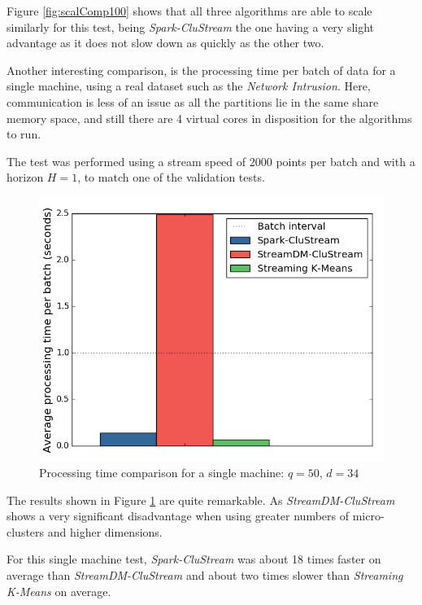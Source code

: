 \documentclass{llncs}
\begin{document}
Figure \ref{fig:scalComp100} shows that all three algorithms are able to scale similarly for this test, being \textit{Spark-CluStream} the one having a very slight advantage as it does not slow down as quickly as the other two.



Another interesting comparison, is the processing time per batch of data for a single machine, using a real dataset such as the \textit{Network Intrusion}. Here, communication is less of an issue as all the partitions lie in the same share memory space, and still there are 4 virtual cores in disposition for the algorithms to run. 

The test was performed using a stream speed of 2000 points per batch and with a horizon $H=1$, to match one of the validation tests.

\begin{figure}[h!]
 \centering
 \includegraphics[scale=0.47]{./styles/singlemachine.png}
 \caption{Processing time comparison for a single machine: $q=50$, $d=34$}
 \label{fig:singlemachine}
\end{figure}

The results shown in Figure \ref{fig:singlemachine} are quite remarkable. As \textit{StreamDM-CluStream} shows a very significant disadvantage when using greater numbers of micro-clusters and higher dimensions.

For this single machine test, \textit{Spark-CluStream} was about 18 times faster on average than \textit{StreamDM-CluStream} and about two times slower than \textit{Streaming K-Means} on average.
\end{document}
